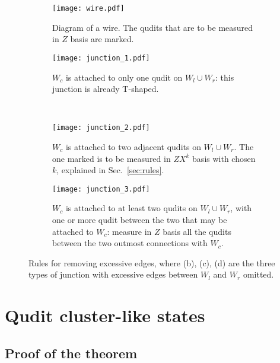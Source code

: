 \documentclass[aps,amsfonts,pra,twocolumn,showpacs]{revtex4-1}
\begin{document}
\begin{figure}[h]
		\begin{subfigure}[t]{0.22\textwidth}
			\centering
			\texttt{[image: wire.pdf]}
			\caption{Diagram of a wire. The qudits that are to be measured in $Z$ basis are marked.}
		\end{subfigure}
		\hspace{1mm}
		\begin{subfigure}[t]{0.22\textwidth}
			\centering
			\texttt{[image: junction\_1.pdf]}
			\caption{$W_c$ is attached to only one qudit on $W_l \cup W_r$: this junction is already T-shaped.}
			\label{junction_1}
		\end{subfigure} \\
		\vspace{1mm}
		\begin{subfigure}[t]{0.22\textwidth}
			\centering
			\texttt{[image: junction\_2.pdf]}
			\caption{$W_c$ is attached to two adjacent qudits on $W_l \cup W_r$. The one marked is to be measured in $ZX^k$ basis with chosen $k$, explained in Sec.~\ref{sec:rules}. }
			\label{junction_2}
		\end{subfigure}
		\hspace{1mm}
		\begin{subfigure}[t]{0.22\textwidth}
			\centering
			\texttt{[image: junction\_3.pdf]}
			\caption{$W_c$ is attached to at least two qudits on $W_l \cup W_r$, with one or more qudit between the two that may be attached to $W_c$: measure in $Z$ basis all the qudits between the two outmost connections with $W_c$.}
			\label{junction_3}
		\end{subfigure}
		\caption{Rules for removing excessive edges, where (b), (c), (d) are the three types of junction with excessive edges between $W_l$ and $W_r$ omitted.}
		\label{remove}
	\end{figure}


\section{Qudit cluster-like states}\label{app:cluster-like}
	
	\subsection{Proof of the theorem} \label{proof}
\end{document}
